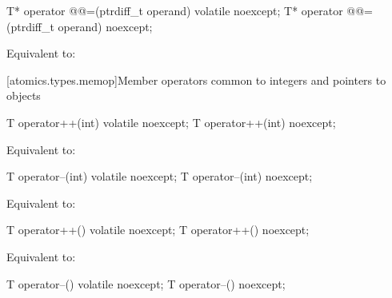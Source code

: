 %
%
\begin{itemdecl}
T* operator @@=(ptrdiff_t operand) volatile noexcept;
T* operator @@=(ptrdiff_t operand) noexcept;
\end{itemdecl}

\begin{itemdescr}
\pnum
\effects Equivalent to: 
\end{itemdescr}

[atomics.types.memop]{Member operators common to integers and pointers to objects}

%
%
\begin{itemdecl}
T operator++(int) volatile noexcept;
T operator++(int) noexcept;
\end{itemdecl}

\begin{itemdescr}
\pnum
\effects Equivalent to: 
\end{itemdescr}

%
%
\begin{itemdecl}
T operator--(int) volatile noexcept;
T operator--(int) noexcept;
\end{itemdecl}

\begin{itemdescr}
\pnum
\effects Equivalent to: 
\end{itemdescr}

%
%
\begin{itemdecl}
T operator++() volatile noexcept;
T operator++() noexcept;
\end{itemdecl}

\begin{itemdescr}
\pnum
\effects Equivalent to: 
\end{itemdescr}

%
%
\begin{itemdecl}
T operator--() volatile noexcept;
T operator--() noexcept;
\end{itemdecl}

